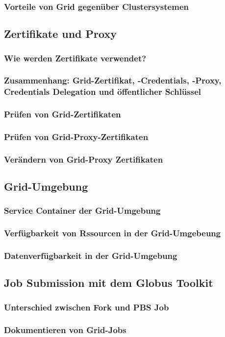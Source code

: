 	\subsubsection*{Vorteile von Grid gegenüber Clustersystemen}

\subsection{Zertifikate und Proxy}
	\subsubsection*{Wie werden Zertifikate verwendet?}
	\subsubsection*{Zusammenhang: Grid-Zertifikat, -Credentials, -Proxy, Credentials Delegation und öffentlicher Schlüssel}

	\subsubsection*{Prüfen von Grid-Zertifikaten}
	\subsubsection*{Prüfen von Grid-Proxy-Zertifikaten}
	\subsubsection*{Verändern von Grid-Proxy Zertifikaten}

\subsection{Grid-Umgebung}
	\subsubsection*{Service Container der Grid-Umgebung}
	\subsubsection*{Verfügbarkeit von Rssourcen in der Grid-Umgebeung}
	\subsubsection*{Datenverfügbarkeit in der Grid-Umgebung}

\subsection{Job Submission mit dem Globus Toolkit}
	\subsubsection*{Unterschied zwischen Fork und PBS Job}
	\subsubsection*{Dokumentieren von Grid-Jobs}

